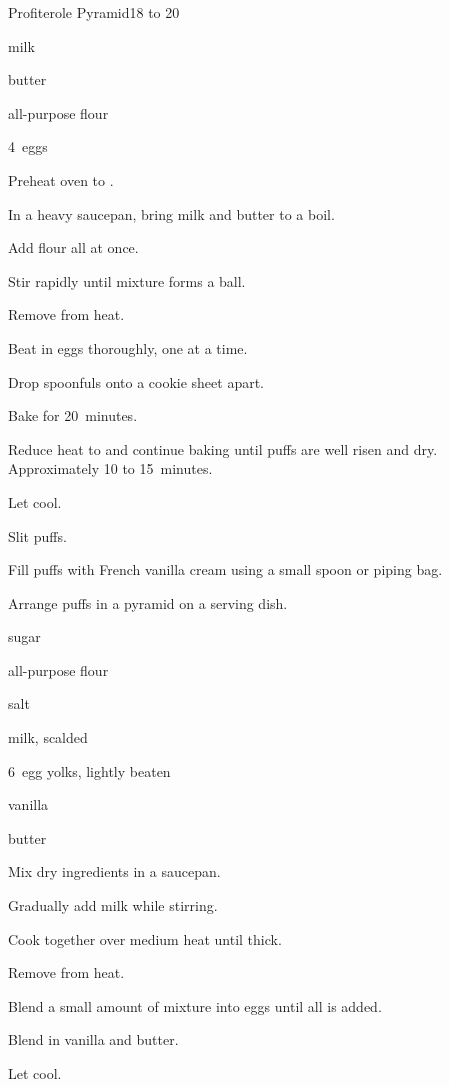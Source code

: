 \begin{recipe}{Profiterole Pyramid}{}{18 to 20}

\begin{ingredients}
\item {} milk
\item \C{\half} butter
\item {} all-purpose flour
\item 4~eggs
\end{ingredients}

\begin{directions}
\item Preheat oven to .
\item In a heavy saucepan, bring milk and butter to a boil.
\item Add flour all at once.
\item Stir rapidly until mixture forms a ball.
\item Remove from heat.
\item Beat in eggs thoroughly, one at a time.
\item Drop spoonfuls onto a cookie sheet  apart.
\item Bake for 20~minutes.
\item Reduce heat to  and continue baking until puffs are well risen and dry. Approximately 10 to 15~minutes.
\item Let cool.
\item Slit puffs.
\item Fill puffs with French vanilla cream using a small spoon or piping bag.
\item Arrange puffs in a pyramid on a serving dish.
\end{directions}

\begin{ingredients}
\item \C{\twothird} sugar
\item \C{\half} all-purpose flour
\item \tp{\half} salt
\item {} milk, scalded
\item 6~egg yolks, lightly beaten
\item {} vanilla
\item {} butter
\end{ingredients}

\begin{directions}
\item Mix dry ingredients in a saucepan.
\item Gradually add milk while stirring.
\item Cook together over medium heat until thick.
\item Remove from heat.
\item Blend a small amount of mixture into eggs until all is added.
\item Blend in vanilla and butter.
\item Let cool.
\end{directions}
\end{recipe}
